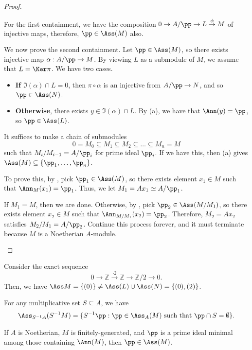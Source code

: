 \begin{proof}
\begin{alphenum}
\item 
For the first containment, we have
the composition $0\to A/\pp\to L\stackrel\phi\to M$ of injective maps,
therefore, $\pp\in\Ass(M)$ also.

We now prove the second containment.
Let $\pp\in\Ass(M)$, so there exists injective map
$\alpha : A/\pp \to M$. By viewing $L$ as a submodule of $M$,
we assume that $L=\Ker\pi$.  We have two cases.
\begin{itemize}
\item \textbf{If $\Im(\alpha)\cap L = 0$},
then $\pi\circ\alpha$ is an injective from
$A/\pp\to N$, and so $\pp\in\Ass(N)$.
\item \textbf{Otherwise}, there exists $y\in\Im(\alpha)\cap L$.
By  (a), we have that $\Ann(y) = \pp$, so $\pp\in\Ass(L)$.
\end{itemize}
\item 
It suffices to make a chain of submodules
$$0=M_0\subseteq M_1 \subseteq M_2 \subseteq \dots \subseteq M_n
= M$$
such that $M_i/M_{i-1} = A/\pp_i$ for prime ideal $\pp_i$.
If we have this, then (a) gives $\Ass(M)\subseteq \{\pp_1,\dots,\pp_n\}$.

To prove this, by ,
pick $\pp_1\in\Ass(M)$, so
there exists element $x_1\in M$ such that $\Ann_M(x_1)=\pp_1$.
Thus, we let $M_1 = Ax_1 \simeq A/\pp_1$.

If $M_1=M$, then we are done.
Otherwise, by , pick $\pp_2 \in \Ass(M/M_1)$,
so there exists element $x_2\in M$ such that 
$\Ann_{M/M_1}(x_2) = \pp_2$. Therefore, $M_2 = Ax_2$
satisfies $M_2/M_1 = A/\pp_2$. 
Continue this process forever, and it must terminate because
$M$ is a Noetherian $A$-module. \qedhere
\end{alphenum}
\end{proof}
\begin{example}
    Consider the exact sequence
    $$0\to\mathbb Z\stackrel{\cdot 2}{\longrightarrow}\mathbb Z
    \to \mathbb Z/2\to 0.$$
    Then, we have $\Ass M = \{(0)\} \neq \Ass(L)\cup\Ass(N)
    =  \{(0), (2)\}$.
\end{example}
\begin{theorem}
    \label{thm:ann_ass}
    \begin{alphenum}
    \item For any multiplicative set $S\subseteq A$, we have
    $$\Ass_{S^{-1}A}(S^{-1}M) = \{S^{-1}\pp : 
    \pp\in \Ass_A(M)\text{ such that }\pp\cap S=\emptyset\}.$$
    \item If $A$ is Noetherian, $M$ is finitely-generated, and $\pp$ is a prime ideal 
    minimal among those containing $\Ann(M)$,
    then $\pp\in\Ass(M)$.
    \end{alphenum}
\end{theorem}
